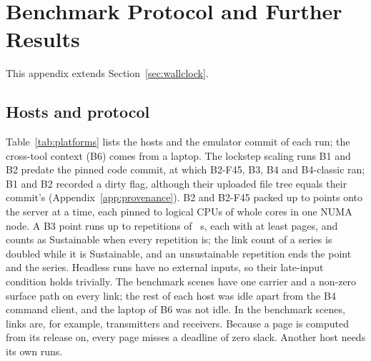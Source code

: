 \section{Benchmark Protocol and Further Results}\label{app:bench}

This appendix extends Section~\ref{sec:wallclock}.

\subsection{Hosts and protocol}

Table~\ref{tab:platforms} lists the hosts and the emulator commit of each run;
the cross-tool context (B6) comes from a laptop. The lockstep scaling runs B1 and B2 predate the
pinned code commit, at which B2-F45, B3, B4 and B4-classic ran; B1 and B2 recorded a dirty flag,
although their uploaded file tree equals their commit's (Appendix~\ref{app:provenance}). B2 and
B2-F45 packed up to \numBtwoSlots{} points onto the server at a time, each pinned to
\numBtwoSlotCpus{} logical CPUs of whole cores in one NUMA node. A B3 point runs up to
\numBthreeReps{} repetitions of \numBthreeMeasureS~s, each with at least \numBthreeMinPages{}
pages, and counts as Sustainable when every repetition is; the link count of a series is doubled
while it is Sustainable, and an unsustainable repetition ends the point and the series.
Headless runs have no external inputs, so their late-input condition holds trivially. The
benchmark scenes have one carrier and a non-zero surface path on every link; the rest of each
host was idle apart from the B4 command client, and the laptop of B6 was not idle.
In the benchmark scenes, \numBtwoMaxLinks{} links are, for example,
\numBtwoLimTx{} transmitters and \numBtwoLimRx{} receivers. Because a page is computed from its
release on, every page misses a deadline of zero slack. Another host needs its own runs.

